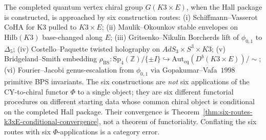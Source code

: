 \begin{remark}
\label{rem:six-routes-g-k3xe}
The completed quantum vertex chiral group \(G(K3 \times E)\), when the
Hall package is constructed, is approached by six construction routes:
(i) Schiffmann--Vasserot CoHA
for K3 pulled to $K3 \times E$; (ii) Maulik--Okounkov stable envelopes
on $\mathrm{Hilb}(K3)$ base-changed along $E$; (iii)
Gritsenko--Nikulin Borcherds lift of $\phi_{0, 1}$ to $\Delta_5$; (iv)
Costello--Paquette twisted holography on $AdS_3 \times S^3 \times K3$;
(v) Bridgeland--Smith embedding
\(\rho_{\mathrm{BS}}\colon\mathrm{Sp}_4(\mathbb{Z})/\{\pm I\}\hookrightarrow
\mathrm{Aut}_{\mathrm{eq}}(D^b(K3 \times E))/{\sim}\); (vi)
Fourier--Jacobi genus-escalation from $\phi_{0, 1}$ via
Gopakumar--Vafa~$1998$ primitive BPS invariants. The six constructions
are \emph{not} six applications of the CY-to-chiral functor $\Phi$ to a
single object; they are six different functorial procedures on different
starting data whose common chiral object is conditional on the completed
Hall package. Their convergence is
Theorem~\ref{thm:six-routes-k3xE-conditional-convergence}, not a
theorem of functoriality.
Conflating the six routes with six $\Phi$-applications is a category
error.
\end{remark}

